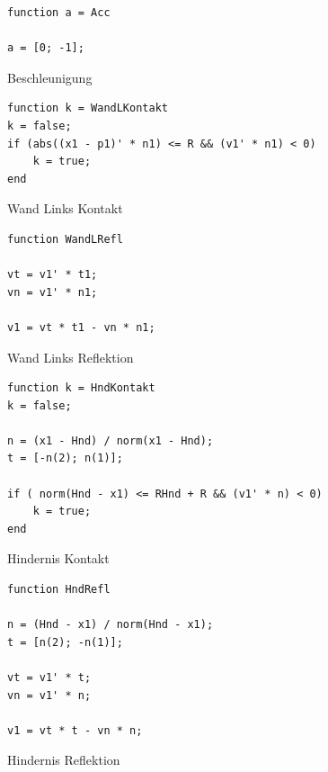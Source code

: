 \documentclass[10pt,a4paper]{article}
\begin{document}
\begin{figure}[H]
\begin{lstlisting}
function a = Acc
 
a = [0; -1];
\end{lstlisting}
\caption{Beschleunigung}
\end{figure}

\begin{figure}[H]
\begin{lstlisting}
function k = WandLKontakt
k = false;
if (abs((x1 - p1)' * n1) <= R && (v1' * n1) < 0)
    k = true;
end
\end{lstlisting}
\caption{Wand Links Kontakt}
\end{figure}

\begin{figure}[H]
\begin{lstlisting}
function WandLRefl

vt = v1' * t1;
vn = v1' * n1;

v1 = vt * t1 - vn * n1;
\end{lstlisting}
\caption{Wand Links Reflektion}
\end{figure}

\begin{figure}[H]
\begin{lstlisting}
function k = HndKontakt
k = false;

n = (x1 - Hnd) / norm(x1 - Hnd);
t = [-n(2); n(1)];

if ( norm(Hnd - x1) <= RHnd + R && (v1' * n) < 0)
    k = true;
end
\end{lstlisting}
\caption{Hindernis Kontakt}
\end{figure}

\begin{figure}[H]
\begin{lstlisting}
function HndRefl

n = (Hnd - x1) / norm(Hnd - x1);
t = [n(2); -n(1)];

vt = v1' * t;
vn = v1' * n;

v1 = vt * t - vn * n;
\end{lstlisting}
\caption{Hindernis Reflektion}
\end{figure}
\end{document}
